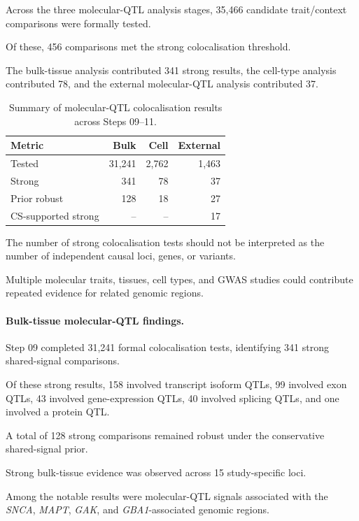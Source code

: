 \documentclass[11pt,a4paper]{article}
\begin{document}
Across the three molecular-QTL analysis stages,
35,466 candidate trait/context comparisons
were formally tested.

Of these, 456 comparisons met the strong
colocalisation threshold.

The bulk-tissue analysis contributed 341 strong
results, the cell-type analysis contributed 78,
and the external molecular-QTL analysis contributed 37.

\begin{table}[t]
\centering
\caption{Summary of molecular-QTL colocalisation
results across Steps 09--11.}
\label{tab:coloc_results_summary}
\small
\begin{tabular}{@{}lrrr@{}}
\toprule
Metric & Bulk & Cell & External \\
\midrule
Tested & 31,241 & 2,762 & 1,463 \\
Strong & 341 & 78 & 37 \\
Prior robust & 128 & 18 & 27 \\
CS-supported strong & -- & -- & 17 \\
\bottomrule
\end{tabular}
\end{table}

The number of strong colocalisation tests should
not be interpreted as the number of independent
causal loci, genes, or variants.

Multiple molecular traits, tissues, cell types,
and GWAS studies could contribute repeated
evidence for related genomic regions.


\paragraph{Bulk-tissue molecular-QTL findings.}

Step 09 completed 31,241 formal colocalisation tests,
identifying 341 strong shared-signal comparisons.

Of these strong results, 158 involved transcript
isoform QTLs, 99 involved exon QTLs,
43 involved gene-expression QTLs,
40 involved splicing QTLs, and one involved
a protein QTL.

A total of 128 strong comparisons remained
robust under the conservative shared-signal prior.

Strong bulk-tissue evidence was observed across
15 study-specific loci.

Among the notable results were molecular-QTL
signals associated with the \textit{SNCA},
\textit{MAPT}, \textit{GAK}, and
\textit{GBA1}-associated genomic regions.
\end{document}
